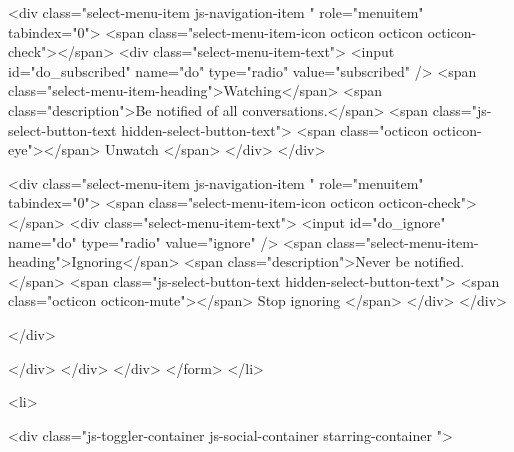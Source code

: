               <div class="select-menu-item js-navigation-item " role="menuitem" tabindex="0">
                <span class="select-menu-item-icon octicon octicon octicon-check"></span>
                <div class="select-menu-item-text">
                  <input id="do_subscribed" name="do" type="radio" value="subscribed" />
                  <span class="select-menu-item-heading">Watching</span>
                  <span class="description">Be notified of all conversations.</span>
                  <span class="js-select-button-text hidden-select-button-text">
                    <span class="octicon octicon-eye"></span>
                    Unwatch
                  </span>
                </div>
              </div>

              <div class="select-menu-item js-navigation-item " role="menuitem" tabindex="0">
                <span class="select-menu-item-icon octicon octicon-check"></span>
                <div class="select-menu-item-text">
                  <input id="do_ignore" name="do" type="radio" value="ignore" />
                  <span class="select-menu-item-heading">Ignoring</span>
                  <span class="description">Never be notified.</span>
                  <span class="js-select-button-text hidden-select-button-text">
                    <span class="octicon octicon-mute"></span>
                    Stop ignoring
                  </span>
                </div>
              </div>

            </div>

          </div>
        </div>
      </div>
</form>
  </li>

  <li>
    
  <div class="js-toggler-container js-social-container starring-container ">

